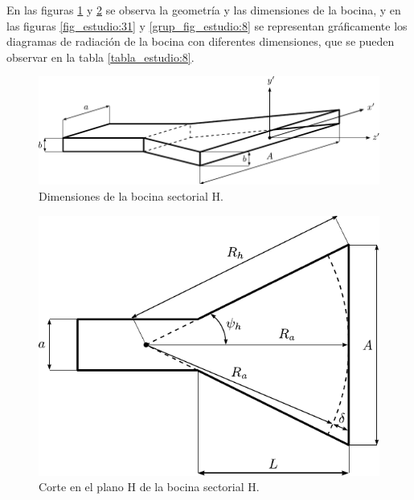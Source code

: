 En las figuras \ref{fig_estudio:29} y \ref{fig_estudio:30} se observa la geometría y las dimensiones de la bocina, y en las figuras \ref{fig_estudio:31} y \ref{grup_fig_estudio:8} se representan gráficamente los diagramas de radiación de la bocina con diferentes dimensiones, que se pueden observar en la tabla \ref{tabla_estudio:8}.
\begin{figure}[H]
\centering
\includegraphics[scale = 1]{Figures/Estudio/estudio_29}
\caption{Dimensiones de la bocina sectorial H.}
\label{fig_estudio:29}
\end{figure}
\begin{figure}[H]
\centering
\includegraphics[scale = 1]{Figures/Estudio/estudio_30}
\caption{Corte en el plano H de la bocina sectorial H.}
\label{fig_estudio:30}
\end{figure}
